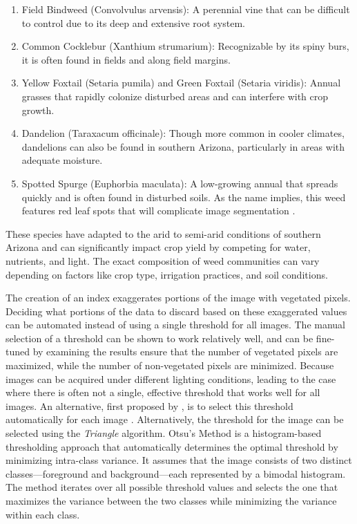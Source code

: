 \documentclass[letterpaper, notitlepage]{report}
\begin{document}
{\begin{enumerate}
	\item{Field Bindweed (Convolvulus arvensis): A perennial vine that can be difficult to control due to its deep and extensive root system.}

	\item{Common Cocklebur (Xanthium strumarium): Recognizable by its spiny burs, it is often found in fields and along field margins.}

	\item{Yellow Foxtail (Setaria pumila) and Green Foxtail (Setaria viridis): Annual grasses that rapidly colonize disturbed areas and can interfere with crop growth.}

	\item{Dandelion (Taraxacum officinale): Though more common in cooler climates, dandelions can also be found in southern Arizona, particularly in areas with adequate moisture.}

	\item{Spotted Spurge (Euphorbia maculata): A low-growing annual that spreads quickly and is often found in disturbed soils. As the name implies, this weed features red leaf spots that will complicate image segmentation \parencite{UC-Davis2009-qy}.}
\end{enumerate}

These species have adapted to the arid to semi-arid conditions of southern Arizona and can significantly impact crop yield by competing for water, nutrients, and light. The exact composition of weed communities can vary depending on factors like crop type, irrigation practices, and soil conditions.

The creation of an index exaggerates portions of the image with vegetated pixels. Deciding what portions of the data to discard based on these exaggerated values can be automated instead of using a single threshold for all images. The manual selection of a threshold can be shown to work relatively well, and can be fine-tuned by examining the results ensure that the number of vegetated pixels are maximized, while the number of non-vegetated pixels are minimized. Because images can be acquired under different lighting conditions, leading to the case where there is often not a single, effective threshold that works well for all images. An alternative, first proposed by \citeauthor{Otsu1979-io}, is to select this threshold automatically for each image \cite{Otsu1979-io}. Alternatively, the threshold for the image can be selected using the \textit{Triangle} algorithm.
Otsu’s Method is a histogram-based thresholding approach that automatically determines the optimal threshold by minimizing intra-class variance. It assumes that the image consists of two distinct classes—foreground and background—each represented by a bimodal histogram. The method iterates over all possible threshold values and selects the one that maximizes the variance between the two classes while minimizing the variance within each class.

}
\end{document}

